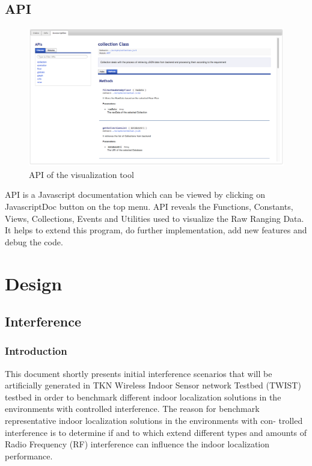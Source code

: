 \documentclass[11pt,a4paper,headinclude,footinclude,chapterprefix=on]{scrreprt}
\begin{document}
\section{API} 
\begin{figure}
	[!] \centering 
	\includegraphics[width=15cm]{Images/tool_jsDoc.png} \caption{API of the visualization tool} \label{fig:tool:jsDoc} 
\end{figure}
API is a Javascript documentation which can be viewed by clicking on JavascriptDoc button on the top menu. API reveals the Functions, Constants, Views, Collections, Events and Utilities used to visualize the Raw Ranging Data. It helps to extend this program, do further implementation, add new features and debug the code. 

\chapter{Design} 
\section{Interference} 
\subsection{Introduction} This document shortly presents initial interference scenarios that will be artificially generated in TKN Wireless Indoor Sensor network Testbed (TWIST) testbed in order to benchmark different indoor localization solutions in the environments with controlled interference. The reason for benchmark representative indoor localization solutions in the environments with con- trolled interference is to determine if and to which extend different types and amounts of Radio Frequency (RF) interference can influence the indoor localization performance. 
\end{document}
